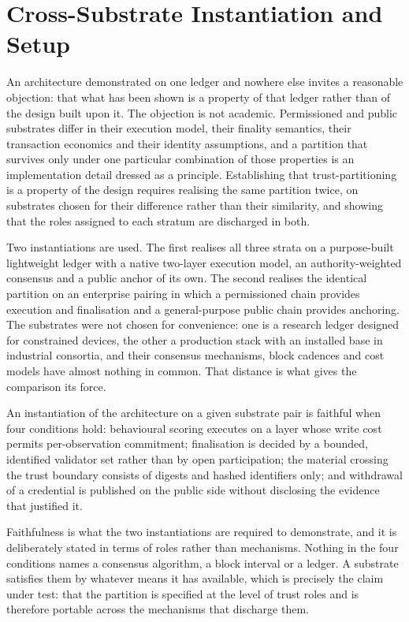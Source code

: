 \section{Cross-Substrate Instantiation and Setup}
\label{sec:strata-substrates}

An architecture demonstrated on one ledger and nowhere else invites a reasonable objection: that what has been shown is a property of that ledger rather than of the design built upon it. The objection is not academic. Permissioned and public substrates differ in their execution model, their finality semantics, their transaction economics and their identity assumptions, and a partition that survives only under one particular combination of those properties is an implementation detail dressed as a principle. Establishing that trust-partitioning is a property of the design requires realising the same partition twice, on substrates chosen for their difference rather than their similarity, and showing that the roles assigned to each stratum are discharged in both.

Two instantiations are used. The first realises all three strata on a purpose-built lightweight ledger with a native two-layer execution model, an authority-weighted consensus and a public anchor of its own. The second realises the identical partition on an enterprise pairing in which a permissioned chain provides execution and finalisation and a general-purpose public chain provides anchoring. The substrates were not chosen for convenience: one is a research ledger designed for constrained devices, the other a production stack with an installed base in industrial consortia, and their consensus mechanisms, block cadences and cost models have almost nothing in common. That distance is what gives the comparison its force.

\begin{definition}
\label{def:faithful-instantiation}
An instantiation of the architecture on a given substrate pair is faithful when four conditions hold: behavioural scoring executes on a layer whose write cost permits per-observation commitment; finalisation is decided by a bounded, identified validator set rather than by open participation; the material crossing the trust boundary consists of digests and hashed identifiers only; and withdrawal of a credential is published on the public side without disclosing the evidence that justified it.
\end{definition}

Faithfulness is what the two instantiations are required to demonstrate, and it is deliberately stated in terms of roles rather than mechanisms. Nothing in the four conditions names a consensus algorithm, a block interval or a ledger. A substrate satisfies them by whatever means it has available, which is precisely the claim under test: that the partition is specified at the level of trust roles and is therefore portable across the mechanisms that discharge them.

